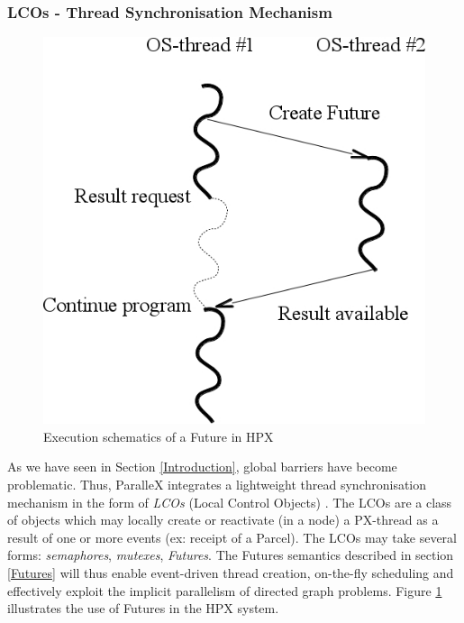 \documentclass[smallextended]{svjour3}
\begin{document}
\subsubsection{LCOs - Thread Synchronisation Mechanism}\label{lcos}

\begin{figure}[h]
\begin{center}
\includegraphics[scale=0.4]{Images/Im5.jpeg}
\end{center}
\caption{Execution schematics of a Future in HPX}
\label{hpxthread}
\end{figure}

As we have seen in Section \ref{Introduction}, global barriers have become problematic. Thus, ParalleX integrates a lightweight thread synchronisation
mechanism in the form of \emph{LCOs} (Local Control Objects) \cite{ParalleX}. The LCOs are a class of objects which may locally create or reactivate (in a node) a PX-thread as a result of one or more events (ex: receipt of a Parcel). The LCOs may take several forms: \emph{semaphores}, \emph{mutexes}, \emph{Futures}. The Futures semantics described in section \ref{Futures} will thus enable event-driven thread creation, on-the-fly scheduling and effectively exploit the implicit parallelism of directed graph problems. Figure \ref{hpxthread} illustrates the use of Futures in the HPX system.
\end{document}
